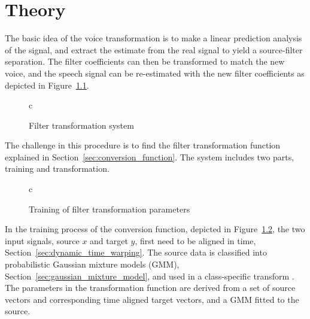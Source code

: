 \chapter{Theory} %
\label{cha:theory}
The basic idea of the voice transformation is to make a linear prediction analysis of the signal, and extract the estimate from the real signal to yield a source-filter separation. The filter coefficients can then be transformed to match the new voice, and the speech signal can be re-estimated with the new filter coefficients as depicted in Figure~\ref{fig:VC}.
\begin{figure}[htbp]
  \centering
   \begin{tabular}[h]{c}
  \end{tabular}
  \caption{Filter transformation system}
  \label{fig:VC}
\end{figure}

The challenge in this procedure is to find the filter transformation function explained in Section~\ref{sec:conversion_function}. The system includes two parts, training and transformation. 
\begin{figure}[htbp]
	\centering
	\begin{tabular}[h]{c}
	\end{tabular}
	\caption{Training of filter transformation parameters}
	\label{fig:VC_training}
\end{figure}
In the training process of the conversion function, depicted in Figure~\ref{fig:VC_training}, the two input signals, source $x$ and target $y$, first need to be aligned in time, Section~\ref{sec:dynamic_time_warping}. The source data is classified into probabilistic Gaussian mixture models (GMM), Section~\ref{sec:gaussian_mixture_model}, and used in a class-specific transform \cite{stylianou09}. The parameters in the transformation function are derived from a set of source vectors and corresponding time aligned target vectors, and a GMM fitted to the source.


